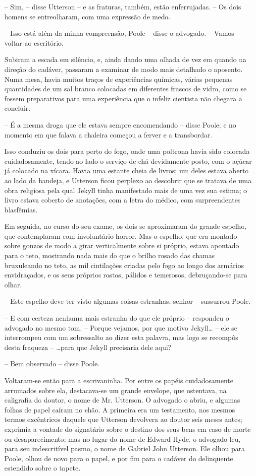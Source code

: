 -- Sim, -- disse Utterson -- e as fraturas, também, estão enferrujadas. --
Os dois homens se entreolharam, com uma expressão de medo. 

-- Isso está além da minha compreensão, Poole -- disse o advogado. --
Vamos voltar ao escritório.

Subiram a escada em silêncio, e, ainda dando uma olhada de vez em quando
na direção do cadáver, passaram a examinar de modo mais detalhado o
aposento.  Numa mesa, havia muitos traços de experiências químicas,
várias pequenas quantidades de um sal branco colocadas em diferentes
frascos de vidro, como se fossem preparativos para uma experiência que
o infeliz cientista não chegara a concluir.

-- É a mesma droga que ele estava sempre encomendando -- disse Poole; e
no momento em que falava a chaleira começou a ferver e a transbordar.

Isso conduziu os dois para perto do fogo, onde uma poltrona havia
sido colocada cuidadosamente, tendo ao lado o serviço de chá devidamente
posto, com o açúcar já colocado na xícara.  Havia uma estante cheia de
livros; um deles estava aberto ao lado da bandeja, e Utterson ficou
perplexo ao descobrir que se tratava de uma obra religiosa pela qual
Jekyll tinha manifestado mais de uma vez sua estima; o livro estava
coberto de anotações, com a letra do médico, com surpreendentes
blasfêmias.

Em seguida, no curso do seu exame, os dois se aproximaram do grande
espelho, que contemplaram com involuntário horror.  Mas o espelho, que
era montado sobre gonzos de modo a girar verticalmente sobre si
próprio, estava apontado para o teto, mostrando nada mais do que o
brilho rosado das chamas bruxuleando no teto, as mil cintilações
criadas pelo fogo ao longo dos armários envidraçados, e os seus
próprios rostos, pálidos e temerosos, debruçando-se para olhar.

-- Este espelho deve ter visto algumas coisas estranhas, senhor --
sussurrou Poole.

-- E com certeza nenhuma mais estranha do que ele próprio -- respondeu o
advogado no mesmo tom. -- Porque vejamos, por que motivo Jekyll\ldots{} -- ele
se interrompeu com um sobressalto ao dizer esta palavra, mas logo se
recompôs desta fraqueza -- \ldots{}para que Jekyll precisaria dele aqui?   %

-- Bem observado -- disse Poole.

Voltaram-se então para a escrivaninha.  Por entre os papéis
cuidadosamente arrumados sobre ela, destacava-se um grande envelope,
que ostentava, na caligrafia do doutor, o nome de Mr. Utterson.  O
advogado o abriu, e algumas folhas de papel caíram no chão.  A primeira
era um testamento, nos mesmos termos excêntricos daquele que Utterson
devolvera ao doutor seis meses antes; exprimia a vontade do signatário
sobre o destino dos seus bens em caso de morte ou desaparecimento; mas
no lugar do nome de Edward Hyde, o advogado leu, para seu indescritível
pasmo, o nome de Gabriel John Utterson.  Ele olhou para Poole, olhou de
novo para o papel, e por fim para o cadáver do delinquente estendido
sobre o tapete.

